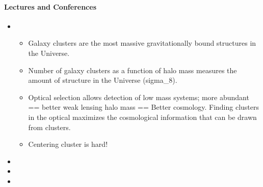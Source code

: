 \documentclass[letterpaper,10pt,english]{sphinxmanual}
\begin{document}
\paragraph{Lectures and Conferences}
\label{\detokenize{resource/astro/reference/cluster_cosmology:lectures-and-conferences}}\begin{itemize}
\item {} 
\begin{itemize}
\item {} 
Galaxy clusters are the most massive gravitationally bound
structures in the Universe.

\item {} 
Number of galaxy clusters as a function of halo mass measures the
amount of structure in the Universe (sigma\_8).

\item {} 
Optical selection allows detection of low mass systems; more
abundant == better weak lensing halo mass == Better cosmology.
Finding clusters in the optical maximizes the cosmological
information that can be drawn from clusters.

\item {} 
Centering cluster is hard!

\end{itemize}

\item {} 

\item {} 

\item {} 

\end{itemize}
\end{document}
